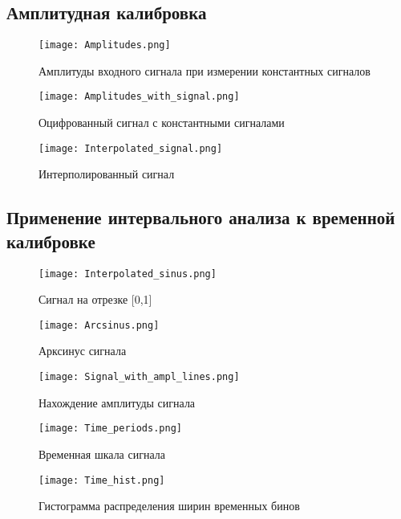 \documentclass[12pt,a4paper]{article}
\begin{document}
\subsection{Амплитудная калибровка}

\begin{figure}[H]
    \centering
    \texttt{[image: Amplitudes.png]}
    \caption{Амплитуды входного сигнала при измерении константных сигналов}
\end{figure}

\begin{figure}[H]
    \centering
    \texttt{[image: Amplitudes\_with\_signal.png]}
    \caption{Оцифрованный сигнал с константными сигналами}
\end{figure}

\begin{figure}[H]
    \centering
    \texttt{[image: Interpolated\_signal.png]}
    \caption{Интерполированный сигнал}
\end{figure}

\subsection{Применение интервального анализа к временной калибровке}

\begin{figure}[H]
    \centering
    \texttt{[image: Interpolated\_sinus.png]}
    \caption{Сигнал на отрезке [0,1]}
\end{figure}

\begin{figure}[H]
    \centering
    \texttt{[image: Arcsinus.png]}
    \caption{Арксинус сигнала}
\end{figure}

\begin{figure}[H]
    \centering
    \texttt{[image: Signal\_with\_ampl\_lines.png]}
    \caption{Нахождение амплитуды сигнала}
\end{figure}

\begin{figure}[H]
    \centering
    \texttt{[image: Time\_periods.png]}
    \caption{Временная шкала сигнала}
\end{figure}

\begin{figure}[H]
    \centering
    \texttt{[image: Time\_hist.png]}
    \caption{Гистограмма распределения ширин временных бинов}
\end{figure}
\end{document}
